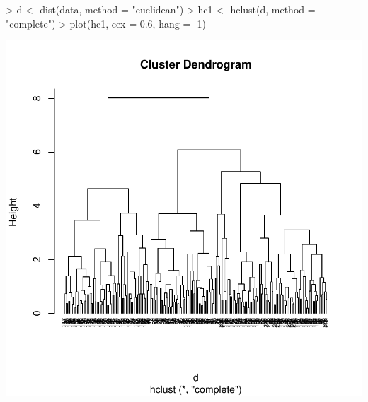 \documentclass [a4paper] {article}
\begin{document}
\begin{Schunk}
\begin{Sinput}
> d <- dist(data, method = "euclidean")
> hc1 <- hclust(d, method = "complete")
> plot(hc1, cex = 0.6, hang = -1)
\end{Sinput}
\end{Schunk}
\includegraphics{entrega-jerarquico_1}
\end{document}
